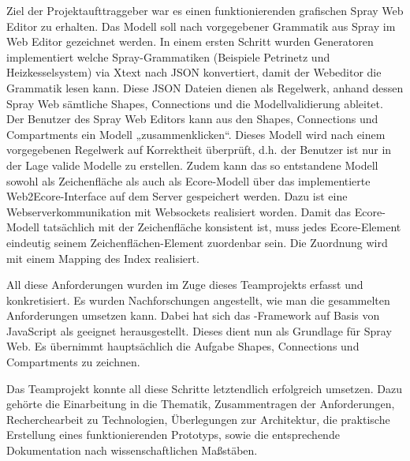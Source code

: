 Ziel der Projektaufttraggeber war es einen funktionierenden grafischen Spray Web
Editor zu erhalten. Das Modell soll nach vorgegebener Grammatik aus Spray im Web Editor gezeichnet werden.
In einem ersten Schritt wurden Generatoren implementiert welche Spray-Grammatiken
(Beispiele Petrinetz und Heizkesselsystem) via Xtext nach JSON konvertiert, damit
der Webeditor die Grammatik lesen kann. Diese JSON Dateien dienen als Regelwerk,
anhand dessen Spray Web sämtliche Shapes, Connections und die Modellvalidierung
ableitet. Der Benutzer des Spray Web Editors kann aus den Shapes, Connections und Compartments ein Modell
„zusammenklicken“. Dieses Modell wird nach einem vorgegebenen Regelwerk auf
Korrektheit überprüft, d.h. der Benutzer ist nur in der Lage valide Modelle
zu erstellen. Zudem kann das so entstandene Modell sowohl als Zeichenfläche als auch als Ecore-Modell über
das implementierte Web2Ecore-Interface auf dem Server gespeichert werden. Dazu ist eine Webserverkommunikation mit Websockets
realisiert worden. Damit das Ecore-Modell tatsächlich mit der Zeichenfläche konsistent ist, muss jedes Ecore-Element
eindeutig seinem Zeichenflächen-Element zuordenbar sein. Die Zuordnung wird mit einem Mapping des Index realisiert.

All diese Anforderungen wurden im Zuge dieses Teamprojekts erfasst und konkretisiert.
Es wurden Nachforschungen angestellt, wie man die gesammelten Anforderungen
umsetzen kann. Dabei hat sich das \dd-Framework auf Basis von JavaScript als
geeignet herausgestellt. Dieses dient nun als Grundlage für Spray Web.
Es übernimmt hauptsächlich die Aufgabe Shapes, Connections und Compartments zu zeichnen.

Das Teamprojekt konnte all diese Schritte letztendlich erfolgreich umsetzen. 
Dazu gehörte die Einarbeitung in die Thematik, Zusammentragen der Anforderungen,
Recherchearbeit zu Technologien, Überlegungen zur Architektur, die praktische Erstellung eines funktionierenden Prototyps,
sowie die entsprechende Dokumentation nach wissenschaftlichen Maßstäben.
